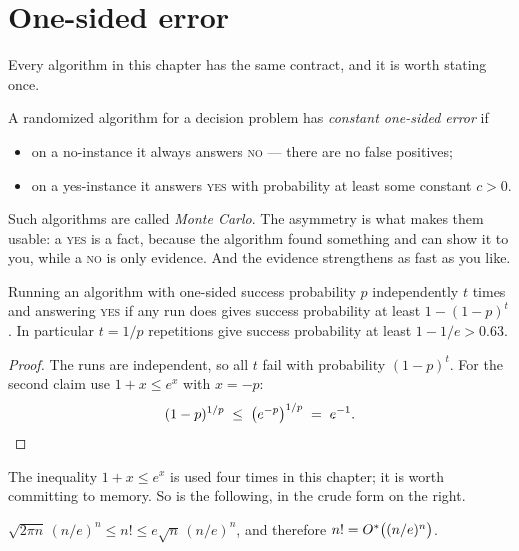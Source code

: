 \section{One-sided error}
\label{sec:one-sided-error}

Every algorithm in this chapter has the same contract, and it is worth stating
once.

\begin{definition}\label{def:one-sided-error}
A randomized algorithm for a decision problem has \emph{constant one-sided
error} if
\begin{itemize}[leftmargin=*,nosep]
  \item on a no-instance it always answers \textsc{no} --- there are no false
        positives;
  \item on a yes-instance it answers \textsc{yes} with probability at least
        some constant $c > 0$.
\end{itemize}
\end{definition}

Such algorithms are called \emph{Monte Carlo}. The asymmetry is what makes them
usable: a \textsc{yes} is a fact, because the algorithm found something and can
show it to you, while a \textsc{no} is only evidence. And the evidence
strengthens as fast as you like.

\begin{lemma}[Amplification]\label{lem:amplification}
Running an algorithm with one-sided success probability $p$ independently
$t$ times and answering \textsc{yes} if any run does gives success probability
at least $1 - (1-p)^t$. In particular $t = 1/p$ repetitions give success
probability at least $1 - 1/e > 0.63$.
\end{lemma}

\begin{proof}
The runs are independent, so all $t$ fail with probability $(1-p)^{t}$. For the
second claim use $1 + x \le e^x$ with $x = -p$:
\[ (1-p)^{1/p} \;\le\; \bigl(e^{-p}\bigr)^{1/p} \;=\; e^{-1}. \qedhere \]
\end{proof}

The inequality $1+x \le e^{x}$ is used four times in this chapter; it is worth
committing to memory. So is the following, in the crude form on the right.

\begin{proposition}\label{prop:stirling}
$\sqrt{2\pi n}\,(n/e)^n \le n! \le e\sqrt{n}\,(n/e)^n$, and therefore
$n! = O^{*}\bigl((n/e)^n\bigr)$.
\end{proposition}

